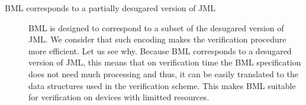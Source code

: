 \begin{description}

\item [BML corresponds to a partially desugared version of JML]

      BML is designed to correspond to a subset of the desugared version of JML.
      We consider that such encoding makes the verification procedure more efficient. 
      Let us see why. Because BML corresponds to a desugared version of JML, this means that on verification time
      the BML specification does not need much processing and thus, it can be easily translated to the
      data structures used in the verification scheme. This makes BML suitable for verification on devices
      with limitted resources.
      
     
      
\end{description}



